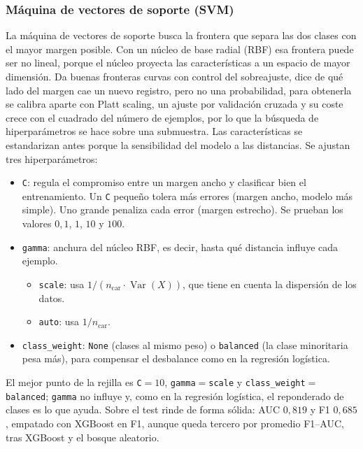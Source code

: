 \documentclass[12pt,a4paper]{report}
\theoremstyle{definition}
\newcommand{\tc}[1]{\texttt{#1}}
\begin{document}
\subsubsection{Máquina de vectores de soporte (SVM)}

La máquina de vectores de soporte busca la frontera que separa las dos clases con el mayor
margen posible. Con un núcleo de base radial (RBF) esa frontera puede ser no lineal, porque el
núcleo proyecta las características a un espacio de mayor dimensión. Da
buenas fronteras curvas con control del sobreajuste, dice de qué lado del margen cae un nuevo registro, pero no una probabilidad, para obtenerla se calibra aparte con Platt scaling, un ajuste por validación cruzada y su coste crece con el cuadrado del número de ejemplos, por lo
que la búsqueda de hiperparámetros se hace sobre una submuestra. Las características se
estandarizan antes porque la sensibilidad del modelo a las distancias. Se ajustan tres hiperparámetros:

\begin{itemize}
\item \tc{C}: regula el compromiso entre un margen ancho y clasificar bien el entrenamiento.
Un \tc{C} pequeño tolera más errores (margen ancho, modelo más simple). Uno grande penaliza
cada error (margen estrecho). Se prueban los valores $0{,}1$, $1$, $10$ y $100$.
\item \tc{gamma}: anchura del núcleo RBF, es decir, hasta qué distancia influye cada ejemplo.
  \begin{itemize}
  \item \tc{scale}: usa $1/(n_\text{car}\cdot \operatorname{Var}(X))$, que tiene en cuenta la
  dispersión de los datos.
  \item \tc{auto}: usa $1/n_\text{car}$.
  \end{itemize}
\item \tc{class\_weight}: \tc{None} (clases al mismo peso) o \tc{balanced} (la clase
minoritaria pesa más), para compensar el desbalance como en la regresión logística.
\end{itemize}

El mejor punto de la rejilla es \tc{C}${}=10$,
\tc{gamma}${}=$\tc{scale} y \tc{class\_weight}${}=$\tc{balanced}; \tc{gamma} no influye y, como
en la regresión logística, el reponderado de clases es lo que ayuda. Sobre el test rinde de
forma sólida: AUC $0{,}819$ y F1 $0{,}685$, empatado con XGBoost en F1, aunque queda tercero por
promedio F1--AUC, tras XGBoost y el bosque aleatorio.
\end{document}
